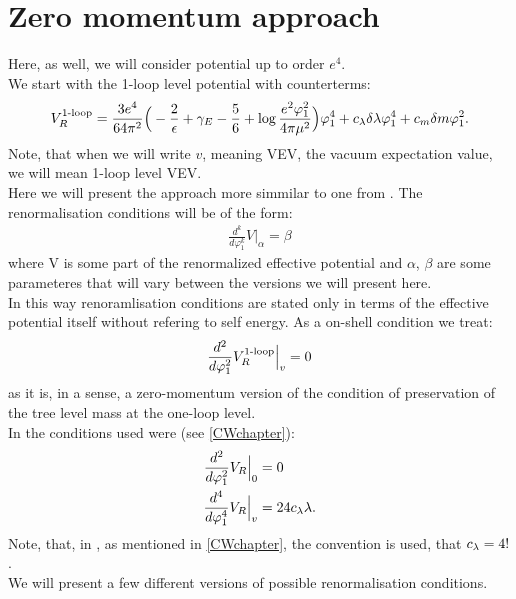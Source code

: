 \chapter{Zero momentum approach}

Here, as well, we will consider potential up to order $e^4$. \\
We start with the 1-loop level potential with counterterms:
\begin{align}
V_R^{\textrm{1-loop}} = \frac{3e^4}{64\pi^2}\Big(-\frac{2}{\epsilon}+\gamma_E-\frac{5}{6}+
\log{\frac{e^2\varphi_1^2}{4\pi\mu^2}}\Big)\varphi_1^4 + c_\lambda\delta\lambda\varphi_1^4+c_m\delta m\varphi_1^2.
\end{align} 
Note, that when we will write $v$, meaning VEV, the vacuum expectation value, we will mean 
1-loop level VEV. \\ 
Here we will present the approach more simmilar to one from \cite{Coleman1973}. 
The renormalisation conditions will be of the form:
\begin{align}
\frac{d^k}{d\varphi_1^k}V\Big|_{\alpha} = \beta
\end{align}
where V is some part of the renormalized effective potential and $\alpha$, $\beta$ are some 
parameteres that will vary between the versions we will present here. \\
In this way renoramlisation conditions are stated only in terms of the effective potential itself 
without refering to self energy. As a on-shell condition we treat:
\begin{align}
{\frac{d^{2}}{d \varphi_1^{2}}V_R^{\textrm{1-loop}}}\Big|_v = 0
\end{align}
as it is, in a sense, a zero-momentum version of the condition of preservation of the tree 
level mass at the one-loop level. \\
In \cite{Coleman1973} the conditions used were (see \ref{CWchapter}):
\begin{align}
{\frac{d^{2}}{d \varphi_1^{2}}V_R\Big|_{0}} &= 0 \\
{\frac{d^{4}}{d \varphi_1^{4}}V_R\Big|_{v}} &= 24c_\lambda\lambda.
\end{align}
Note, that, in \citeColWein, as mentioned in \ref{CWchapter}, the convention is used, that 
$c_\lambda = 4!$. \\
We will present a few different versions of possible renormalisation conditions.

